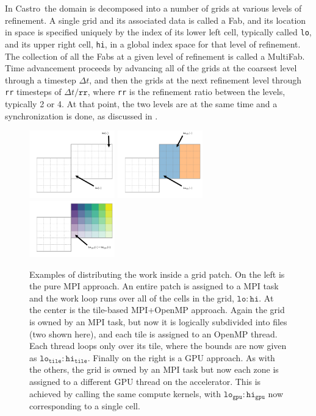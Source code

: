 \documentclass[preprint,times]{aastex62}
\newcommand{\castro}{{\sf Castro}}
\newcommand{\fab}{{\sf Fab}}
\newcommand{\multifab}{{\sf MultiFab}}
\begin{document}
In \castro\ the domain is decomposed into a number of grids at various
levels of refinement.  A single grid and its associated data is called
a \fab, and its location in space is specified uniquely by the index
of its lower left cell, typically called {\tt lo}, and its upper right
cell, {\tt hi}, in a global index space for that level of refinement.
The collection of all the \fab s at a given level of refinement is
called a \multifab.  Time advancement proceeds by advancing all of the
grids at the coarsest level through a timestep $\Delta t$, and then
the grids at the next refinement level through {\tt rr} timesteps of
$\Delta t/\mathtt{rr}$, where {\tt rr} is the refinement ratio between
the levels, typically 2 or 4.  At that point, the two levels are at
the same time and a synchronization is done, as discussed in \cite{castro}.

\begin{figure}[t]
\centering
\includegraphics[width=0.33\textwidth]{gpu_1} 
\includegraphics[width=0.33\textwidth]{gpu_2} 
\includegraphics[width=0.33\textwidth]{gpu_3}
\caption{\label{fig:loops} Examples of distributing the work inside a
  grid patch.  On the left is the pure MPI approach.  An entire patch
  is assigned to a MPI task and the work loop runs over all of the
  cells in the grid, $\mathtt{lo:hi}$.  At the center is the
  tile-based MPI+OpenMP approach.  Again the grid is owned by an MPI
  task, but now it is logically subdivided into files (two shown
  here), and each tile is assigned to an OpenMP thread.  Each thread
  loops only over its tile, where the bounds are now given as
  $\mathtt{lo_{tile}:hi_{tile}}$.  Finally on the right is a GPU
  approach.  As with the others, the grid is owned by an MPI task but
  now each zone is assigned to a different GPU thread on the
  accelerator.  This is achieved by calling the same compute kernels,
  with $\mathtt{lo_{gpu}:hi_{gpu}}$ now corresponding to a single cell.}
\end{figure}
\end{document}
